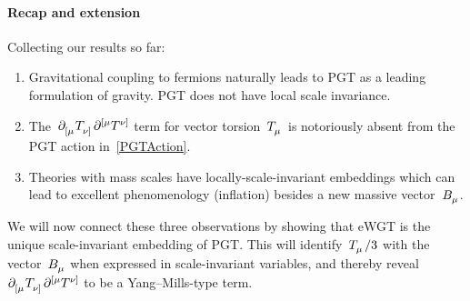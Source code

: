 \documentclass[aps,prd,reprint,preprintnumbers,showpacs,floatfix,nofootinbib,superscript address]{revtex4-2}
\begin{document}
\paragraph*{Recap and extension} Collecting our results so far:
\begin{enumerate}
	\item Gravitational coupling to fermions naturally leads to PGT as a leading formulation of gravity. PGT does not have local scale invariance.
	\item The~$\PD{_{[\mu}}\MAGT{_{\nu]}}\PD{^{[\mu}}\MAGT{^{\nu]}}$ term for vector torsion~$\MAGT{_\mu}$ is notoriously absent from the PGT action in~\cref{PGTAction}.
	\item Theories with mass scales have locally-scale-invariant embeddings which can lead to excellent phenomenology (inflation) besides a new massive vector~$\FieldV{_\mu}$.
\end{enumerate}
We will now connect these three observations by showing that eWGT is the unique scale-invariant embedding of PGT. This will identify~$\MAGT{_\mu}/3$ with the vector~$\FieldV{_\mu}$ when expressed in scale-invariant variables, and thereby reveal~$\PD{_{[\mu}}\MAGT{_{\nu]}}\PD{^{[\mu}}\MAGT{^{\nu]}}$ to be a Yang--Mills-type term.
\end{document}

